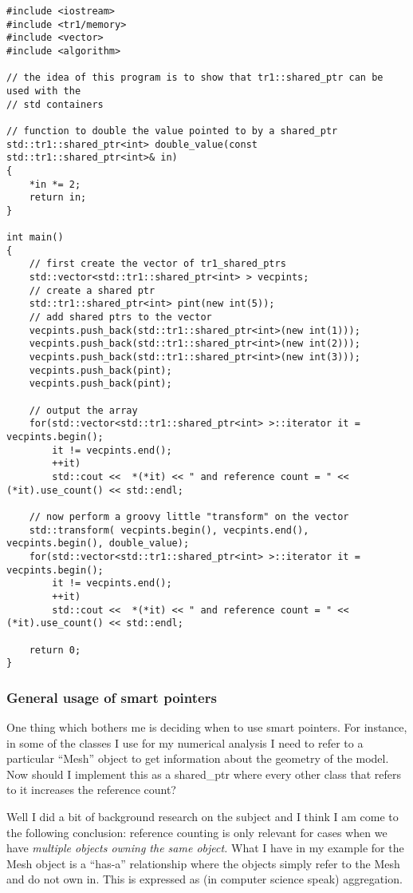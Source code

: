 \begin{lstlisting}
#include <iostream>
#include <tr1/memory>
#include <vector>
#include <algorithm>

// the idea of this program is to show that tr1::shared_ptr can be used with the
// std containers

// function to double the value pointed to by a shared_ptr
std::tr1::shared_ptr<int> double_value(const std::tr1::shared_ptr<int>& in)
{
	*in *= 2;
	return in;
}

int main()
{
	// first create the vector of tr1_shared_ptrs
	std::vector<std::tr1::shared_ptr<int> > vecpints;
	// create a shared ptr
	std::tr1::shared_ptr<int> pint(new int(5));
	// add shared ptrs to the vector
	vecpints.push_back(std::tr1::shared_ptr<int>(new int(1)));
	vecpints.push_back(std::tr1::shared_ptr<int>(new int(2)));
	vecpints.push_back(std::tr1::shared_ptr<int>(new int(3)));
	vecpints.push_back(pint);
	vecpints.push_back(pint);

	// output the array
	for(std::vector<std::tr1::shared_ptr<int> >::iterator it = vecpints.begin();
		it != vecpints.end();
		++it)
		std::cout <<  *(*it) << " and reference count = " <<  (*it).use_count() << std::endl;

	// now perform a groovy little "transform" on the vector
	std::transform( vecpints.begin(), vecpints.end(), vecpints.begin(), double_value);
	for(std::vector<std::tr1::shared_ptr<int> >::iterator it = vecpints.begin();
		it != vecpints.end();
		++it)
		std::cout <<  *(*it) << " and reference count = " <<  (*it).use_count() << std::endl;
	
	return 0;
}

\end{lstlisting}

\subsubsection{General usage of smart pointers}
\label{sec:general-usuage-smart}

One thing which bothers me is deciding when to use smart pointers. For
instance, in some of the classes I use for my numerical analysis I
need to refer to a particular ``Mesh'' object to get information about
the geometry of the model. Now should I implement this as a
shared\_ptr where every other class that refers to it increases the
reference count?

Well I did a bit of background research on the subject and I think I
am come to the following conclusion: reference counting is only
relevant for cases when we have \textit{multiple objects owning the
  same object.} What I have in my example for the Mesh object is a
``has-a'' relationship where the objects simply refer to the Mesh and
do not own in. This is expressed as  (in computer science
speak) aggregation.

